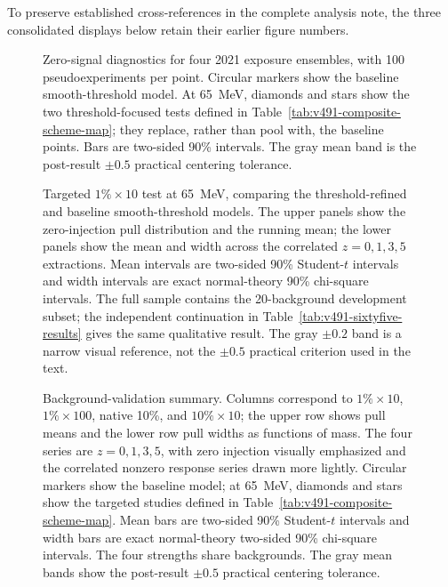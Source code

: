 \ifwritingsample
\else
To preserve established cross-references in the complete analysis note, the three
consolidated displays below retain their earlier figure numbers.
\setcounter{figure}{63}
\fi
\begin{figure}[p]
\centering
{}
\caption{Zero-signal diagnostics for four 2021 exposure ensembles, with 100
pseudoexperiments per point. Circular markers show the baseline smooth-threshold
model. At 65~MeV, diamonds and stars show the two threshold-focused tests defined in
Table~\ref{tab:v491-composite-scheme-map}; they replace, rather than pool with, the
baseline points. Bars are two-sided 90\% intervals. The gray mean band is the
post-result $\pm0.5$ practical centering tolerance.}
\label{fig:v491-zero-signal-full}
\end{figure}

\begin{figure}[p]
\centering
{}
\caption{Targeted $1\%\times10$ test at 65~MeV, comparing the threshold-refined and
baseline smooth-threshold models. The upper panels show the zero-injection pull
distribution and the running mean; the lower panels show the mean and width across
the correlated $z=0,1,3,5$ extractions.  Mean intervals are two-sided 90\%
Student-$t$ intervals and width intervals are exact normal-theory 90\% chi-square
intervals. The full sample contains the 20-background development subset; the
independent continuation in Table~\ref{tab:v491-sixtyfive-results} gives the same
qualitative result. The gray $\pm0.2$ band is a narrow visual reference, not the
$\pm0.5$ practical criterion used in the text.}
\label{fig:v491-sixtyfive-confirmation}
\end{figure}

\begin{figure}[p]
\centering
{}
\caption{Background-validation summary. Columns correspond to
$1\%\times10$, $1\%\times100$, native 10\%, and $10\%\times10$; the upper row
shows pull means and the lower row pull widths as functions of mass.  The four series
are $z=0,1,3,5$, with zero injection visually emphasized and the correlated nonzero
response series drawn more lightly. Circular markers show the baseline model; at
65~MeV, diamonds and stars show the targeted studies defined in
Table~\ref{tab:v491-composite-scheme-map}. Mean bars are
two-sided 90\% Student-$t$ intervals and width bars are exact normal-theory two-sided
90\% chi-square intervals. The four strengths share backgrounds. The gray mean bands show the post-result $\pm0.5$ practical
centering tolerance.}
\label{fig:v491-pull-summary}
\end{figure}

